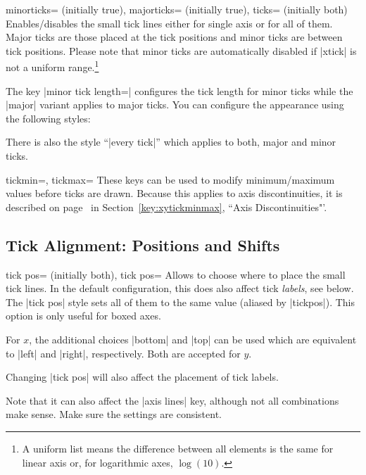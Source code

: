 \begin{pgfplotsxykeylist}{%
    \x minorticks= (initially true),
    \x majorticks= (initially true),
    ticks= (initially both)%
}
    Enables/disables the small tick lines either for single axis or for all of
    them. Major ticks are those placed at the tick positions and minor ticks
    are between tick positions. Please note that minor ticks are automatically
    disabled if |xtick| is not a uniform range.\footnote{A uniform list means
    the difference between all elements is the same for linear axis or, for
    logarithmic axes, $\log(10)$.}

    The key |minor tick length=| configures the tick length for
    minor ticks while the |major| variant applies to major ticks. You can
    configure the appearance using the following styles:
\begin{codeexample}
\end{codeexample}
    There is also the style ``|every tick|'' which applies to both, major and
    minor ticks.
\end{pgfplotsxykeylist}

\begin{pgfplotsxykeylist}{\x tickmin=, \x tickmax=}
    These keys can be used to modify minimum/maximum values before ticks are
    drawn. Because this applies to axis discontinuities, it is described on
    page~\pageref{key:xytickminmax} in Section~\ref{key:xytickminmax}, ``Axis
    Discontinuities"'.
\end{pgfplotsxykeylist}


\subsection{Tick Alignment: Positions and Shifts}

\begin{pgfplotsxykeylist}{%
    \x tick pos= (initially both),
    tick pos=%
}
    Allows to choose where to place the small tick lines. In the default
    configuration, this does also affect tick \emph{labels}, see below. The
    |tick pos| style sets all of them to the same value (aliased by
    |tickpos|). This option is only useful
    for boxed axes.

    For $x$, the additional choices |bottom| and |top| can be used which are
    equivalent to |left| and |right|, respectively. Both are accepted for $y$.

    Changing |tick pos| will also affect the placement of tick labels.

    Note that it can also affect the |axis lines| key, although not all
    combinations make sense. Make sure the settings are consistent.
\end{pgfplotsxykeylist}

